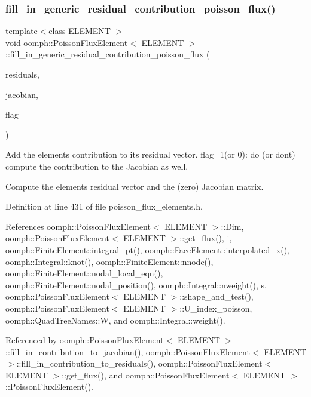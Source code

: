 \subsubsection{\texorpdfstring{fill\+\_\+in\+\_\+generic\+\_\+residual\+\_\+contribution\+\_\+poisson\+\_\+flux()}{fill\_in\_generic\_residual\_contribution\_poisson\_flux()}}
{\footnotesize\ttfamily template$<$class E\+L\+E\+M\+E\+NT $>$ \\
void \hyperlink{classoomph_1_1PoissonFluxElement}{oomph\+::\+Poisson\+Flux\+Element}$<$ E\+L\+E\+M\+E\+NT $>$\+::fill\+\_\+in\+\_\+generic\+\_\+residual\+\_\+contribution\+\_\+poisson\+\_\+flux (\begin{DoxyParamCaption}\item[{\hyperlink{classoomph_1_1Vector}{Vector}$<$ double $>$ \&}]{residuals,  }\item[{\hyperlink{classoomph_1_1DenseMatrix}{Dense\+Matrix}$<$ double $>$ \&}]{jacobian,  }\item[{const unsigned \&}]{flag }\end{DoxyParamCaption})\hspace{0.3cm}{\ttfamily [private]}}



Add the element\textquotesingle{}s contribution to its residual vector. flag=1(or 0)\+: do (or don\textquotesingle{}t) compute the contribution to the Jacobian as well. 

Compute the element\textquotesingle{}s residual vector and the (zero) Jacobian matrix. 

Definition at line 431 of file poisson\+\_\+flux\+\_\+elements.\+h.



References oomph\+::\+Poisson\+Flux\+Element$<$ E\+L\+E\+M\+E\+N\+T $>$\+::\+Dim, oomph\+::\+Poisson\+Flux\+Element$<$ E\+L\+E\+M\+E\+N\+T $>$\+::get\+\_\+flux(), i, oomph\+::\+Finite\+Element\+::integral\+\_\+pt(), oomph\+::\+Face\+Element\+::interpolated\+\_\+x(), oomph\+::\+Integral\+::knot(), oomph\+::\+Finite\+Element\+::nnode(), oomph\+::\+Finite\+Element\+::nodal\+\_\+local\+\_\+eqn(), oomph\+::\+Finite\+Element\+::nodal\+\_\+position(), oomph\+::\+Integral\+::nweight(), s, oomph\+::\+Poisson\+Flux\+Element$<$ E\+L\+E\+M\+E\+N\+T $>$\+::shape\+\_\+and\+\_\+test(), oomph\+::\+Poisson\+Flux\+Element$<$ E\+L\+E\+M\+E\+N\+T $>$\+::\+U\+\_\+index\+\_\+poisson, oomph\+::\+Quad\+Tree\+Names\+::W, and oomph\+::\+Integral\+::weight().



Referenced by oomph\+::\+Poisson\+Flux\+Element$<$ E\+L\+E\+M\+E\+N\+T $>$\+::fill\+\_\+in\+\_\+contribution\+\_\+to\+\_\+jacobian(), oomph\+::\+Poisson\+Flux\+Element$<$ E\+L\+E\+M\+E\+N\+T $>$\+::fill\+\_\+in\+\_\+contribution\+\_\+to\+\_\+residuals(), oomph\+::\+Poisson\+Flux\+Element$<$ E\+L\+E\+M\+E\+N\+T $>$\+::get\+\_\+flux(), and oomph\+::\+Poisson\+Flux\+Element$<$ E\+L\+E\+M\+E\+N\+T $>$\+::\+Poisson\+Flux\+Element().

